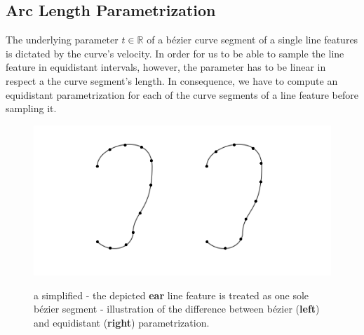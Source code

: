 \subsection{Arc Length Parametrization}
The underlying parameter $t \in \mathbb{R}$ of a b\'{e}zier curve segment of a single line features is dictated by the curve's velocity. In order for us to be able to sample the line feature in equidistant intervals, however, the parameter has to be linear in respect a the curve segment's length. In consequence, we have to compute an equidistant parametrization for each of the curve segments of a line feature before sampling it.
\def\earpathf{(-1,1.5) .. controls (-1,2.3) and (1,2.8) .. (1,1.5) .. controls (1, -.2) and (0.3,-.1) .. (0.3,-1) .. controls (0.2,-1.5) and (-.5, -1.7) .. (-1,-1.25);}
\def\earpaths{(3,1.5) .. controls (3,2.3) and (5,2.8) .. (5,1.5) .. controls (5, -.2) and (4.3,-.1) .. (4.3,-1) .. controls (4.2,-1.5) and (3.5, -1.7) .. (3,-1.25);}
\begin{figure}[h!]
    \centering
    \includegraphics{./resources/figures/ears_diffparam.pdf}
    \label{fig:diffparam}
    \caption{a simplified - the depicted \textbf{ear} line feature is treated as one sole b\'{e}zier segment - illustration of the difference between b\'{e}zier (\textbf{left}) and equidistant (\textbf{right}) parametrization.}

\end{figure}
